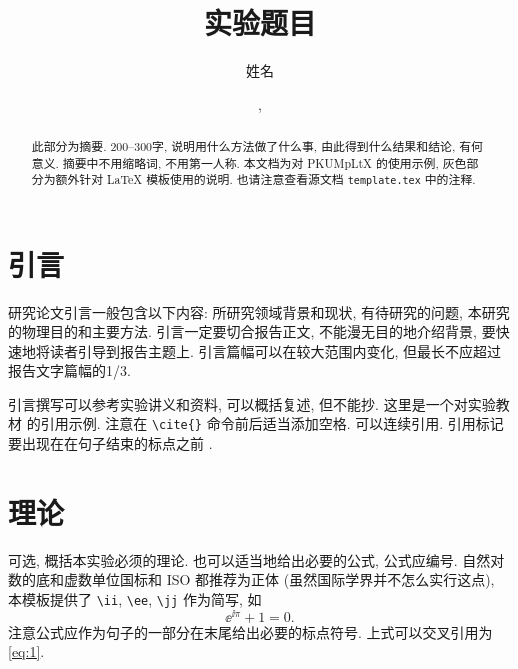 \documentclass[font=notofandol]{mpltx}
\newcommand{\note}[1]{{\color{gray}#1}}
\begin{document}
\title{实验题目} %
\author{姓名} %
\makeatletter\date{\mpltx@filedate, \mpltx@fileversion}\makeatother

\begin{abstract}
    此部分为摘要.
    200--300字, 说明用什么方法做了什么事, 由此得到什么结果和结论, 有何意义.
    摘要中不用缩略词, 不用第一人称.
    \note{本文档为对 \textsf{PKUMpLtX} 的使用示例, 灰色部分为额外针对 \LaTeX{} 模板使用的说明.
        也请注意查看源文档 \texttt{template.tex} 中的注释.}
\end{abstract}

\maketitle

\section{引言}

研究论文引言一般包含以下内容:
所研究领域背景和现状,
有待研究的问题,
本研究的物理目的和主要方法.
引言一定要切合报告正文, 不能漫无目的地介绍背景, 要快速地将读者引导到报告主题上.
引言篇幅可以在较大范围内变化, 但最长不应超过报告文字篇幅的1/3.

引言撰写可以参考实验讲义和资料, 可以概括复述, 但不能抄.
\note{这里是一个对实验教材 \cite{jindaishiyan} 的引用示例.}
\note{注意在 \texttt{\textbackslash{}cite\{\}} 命令前后适当添加空格.
    可以连续引用.
    引用标记要出现在在句子结束的标点之前 \cite{jindaishiyan,zamojski2007deep}.}

\section{理论}\label{sec:theory}

可选, 概括本实验必须的理论.
也可以适当地给出必要的公式, 公式应编号.
\note{自然对数的底和虚数单位国标和 ISO 都推荐为正体 (虽然国际学界并不怎么实行这点), 本模板提供了 \texttt{\textbackslash{}ii}, \texttt{\textbackslash{}ee}, \texttt{\textbackslash{}jj} 作为简写, 如
    \begin{equation}\label{eq:1}
        \ee^{\ii\pi}+1=0.
    \end{equation}
    注意公式应作为句子的一部分在末尾给出必要的标点符号.
    上式可以交叉引用为\autoref{eq:1}.}
\end{document}
